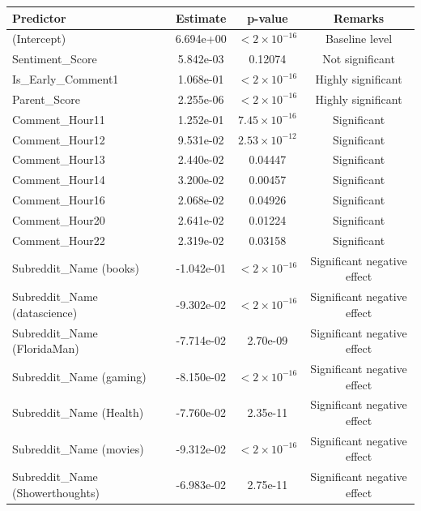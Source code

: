 \documentclass[10pt]{article}
\begin{document}
\begin{table}[H]
\centering
\small
\begin{tabular}{lccc}
\toprule
\textbf{Predictor} & \textbf{Estimate} & \textbf{p-value} & \textbf{Remarks} \\
\midrule
(Intercept)                     & 6.694e+00 & $<2\times10^{-16}$ & Baseline level \\
Sentiment\_Score                & 5.842e-03 & 0.12074           & Not significant \\
Is\_Early\_Comment1             & 1.068e-01 & $<2\times10^{-16}$ & Highly significant \\
Parent\_Score                   & 2.255e-06 & $<2\times10^{-16}$ & Highly significant \\
Comment\_Hour11                 & 1.252e-01 & $7.45\times10^{-16}$ & Significant \\
Comment\_Hour12                 & 9.531e-02 & $2.53\times10^{-12}$ & Significant \\
Comment\_Hour13                 & 2.440e-02 & 0.04447           & Significant \\
Comment\_Hour14                 & 3.200e-02 & 0.00457           & Significant \\
Comment\_Hour16                 & 2.068e-02 & 0.04926           & Significant \\
Comment\_Hour20                 & 2.641e-02 & 0.01224           & Significant \\
Comment\_Hour22                 & 2.319e-02 & 0.03158           & Significant \\
Subreddit\_Name (books)         & -1.042e-01 & $<2\times10^{-16}$ & Significant negative effect \\
Subreddit\_Name (datascience)   & -9.302e-02 & $<2\times10^{-16}$ & Significant negative effect \\
Subreddit\_Name (FloridaMan)    & -7.714e-02 & 2.70e-09         & Significant negative effect \\
Subreddit\_Name (gaming)        & -8.150e-02 & $<2\times10^{-16}$ & Significant negative effect \\
Subreddit\_Name (Health)        & -7.760e-02 & 2.35e-11         & Significant negative effect \\
Subreddit\_Name (movies)        & -9.312e-02 & $<2\times10^{-16}$ & Significant negative effect \\
Subreddit\_Name (Showerthoughts)& -6.983e-02 & 2.75e-11         & Significant negative effect \\

\end{tabular}
\end{table}
\end{document}
